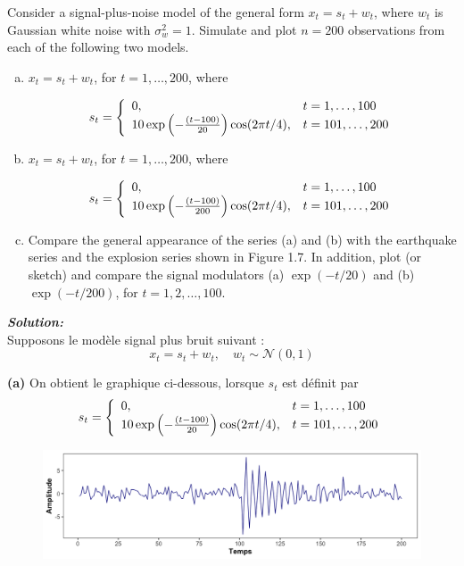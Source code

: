 \documentclass{homework}
\begin{document}
Consider a signal-plus-noise model of the general form $x_t = s_t + w_t$, where $w_t$ is Gaussian white noise with $\sigma^2_w = 1$. Simulate and plot $n = 200$ observations from each of the following two models.
\begin{enumerate}[(a)]
    \item $x_t = s_t + w_t$, for $t = 1, \dots, 200$, where

$$s_t = \left\{
    \begin{array}{l l} 
        0, & t = 1, \dots, 100 \\ 
        10\exp\left(-\frac{(t - 100)}{20}\right)\cos(2\pi t / 4), & t = 101, \dots, 200
    \end{array}
  \right.$$
  \item $x_t = s_t + w_t$, for $t = 1, \dots, 200$, where

$$s_t = \left\{
    \begin{array}{l l} 
        0, & t = 1, \dots, 100 \\ 
        10\exp\left(-\frac{(t - 100)}{200}\right)\cos(2\pi t / 4), & t = 101, \dots, 200
    \end{array}
  \right.$$

   \item Compare the general appearance of the series (a) and (b) with the earthquake series and the explosion series shown in Figure 1.7. In addition, plot (or sketch) and compare the signal modulators (a) $\exp{(-t/20)}$ and (b) $\exp{(-t/200)}$, for $t = 1,2,\dots,100$.
\end{enumerate}

\vspace{1cm}

\textit{\textbf{Solution:}}\\
Supposons le modèle signal plus bruit suivant :
$$x_t = s_t + w_t, \quad w_t \sim \mathcal{N}(0, 1)$$


\textbf{(a)} On obtient le graphique ci-dessous, lorsque $s_t$ est définit par
    $$s_t = \left\{
    \begin{array}{l l} 
        0, & t = 1, \dots, 100 \\ 
        10\exp\left(-\frac{(t - 100)}{20}\right)\cos(2\pi t / 4), & t = 101, \dots, 200
    \end{array}
  \right.$$
\begin{figure}[h]
    \centering
    \includegraphics[width=1\linewidth]{figure1.2a.png}
\end{figure}
\end{document}

